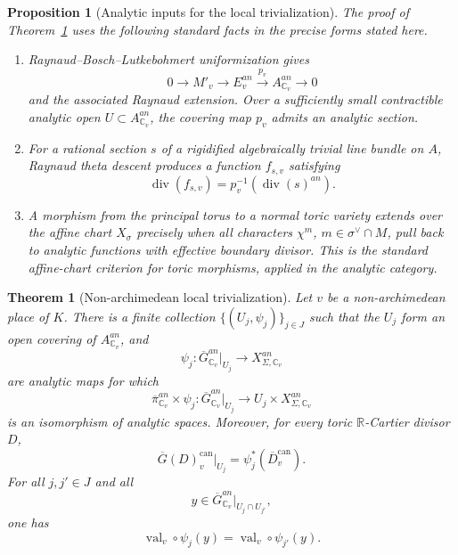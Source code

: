\documentclass[10pt,a4paper]{amsart}
\newtheorem{thm}{Theorem}
\newtheorem{proposition}{Proposition}
\begin{document}
\begin{proposition}[Analytic inputs for the local trivialization]\label{input:local-triv-analytic}
	The proof of Theorem~\ref{thm:local-trivialization} uses the following standard
	facts in the precise forms stated here.
	\begin{enumerate}[leftmargin=2em]
		\item Raynaud--Bosch--Lutkebohmert uniformization gives
		\[
		0\to M'_v\to E_v^{an}\xrightarrow{p_v}A_{\mathbb C_v}^{an}\to0
		\]
		and the associated Raynaud extension.  Over a sufficiently small contractible
		analytic open \(U\subset A_{\mathbb C_v}^{an}\), the covering map \(p_v\) admits
		an analytic section.
		\item For a rational section \(s\) of a rigidified algebraically trivial line
		bundle on \(A\), Raynaud theta descent produces a function \(f_{s,v}\) satisfying
		\[
		\operatorname{div}(f_{s,v})=p_v^{-1}(\operatorname{div}(s)^{an}).
		\]
		\item A morphism from the principal torus to a normal toric variety extends over
		the affine chart \(X_\sigma\) precisely when all characters
		\(\chi^m\), \(m\in\sigma^\vee\cap M\), pull back to analytic functions with
		effective boundary divisor.  This is the standard affine-chart criterion for
		toric morphisms, applied in the analytic category.
	\end{enumerate}
\end{proposition}

\begin{thm}[Non-archimedean local trivialization]\label{thm:local-trivialization}
	Let \(v\) be a non-archimedean place of \(K\).  There is a finite collection
	\(\{(U_j,\psi_j)\}_{j\in J}\) such that the \(U_j\) form an open covering of
	\(A^{an}_{\mathbb C_v}\), and
	\[
	\psi_j:
	\overline{G}^{an}_{\mathbb C_v}|_{U_j}
	\longrightarrow
	X_{\Sigma,\mathbb C_v}^{an}
	\]
	are analytic maps for which
	\[
	\overline{\pi}^{an}_{\mathbb C_v}\times\psi_j:
	\overline{G}^{an}_{\mathbb C_v}|_{U_j}
	\longrightarrow
	U_j\times X_{\Sigma,\mathbb C_v}^{an}
	\]
	is an isomorphism of analytic spaces.  Moreover, for every toric
	\(\mathbb R\)-Cartier divisor \(D\),
	\[
	\overline{G}(D)^{\mathrm{can}}_v|_{U_j}
	=
	\psi_j^*(\overline{D}^{\mathrm{can}}_v).
	\]
	For all \(j,j'\in J\) and all
	\[
	y\in \overline{G}^{an}_{\mathbb C_v}|_{U_j\cap U_{j'}},
	\]
	one has
	\[
	\operatorname{val}_v\circ\psi_j(y)
	=
	\operatorname{val}_v\circ\psi_{j'}(y).
	\]
\end{thm}
\end{document}
